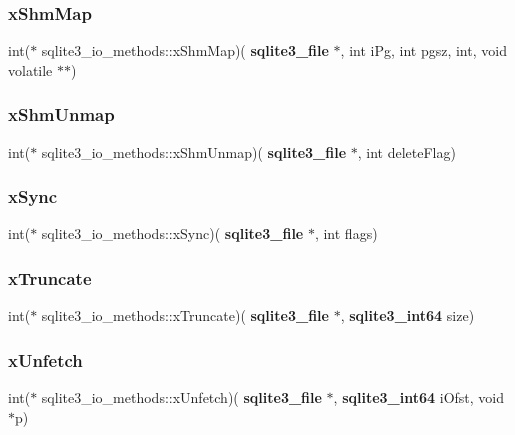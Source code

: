 \mbox{\label{structsqlite3__io__methods_a42d21006b7f01acb258986f2c090c64d}} 
\subsubsection{xShmMap}
{\footnotesize\ttfamily int($\ast$ sqlite3\+\_\+io\+\_\+methods\+::x\+Shm\+Map)(\textbf{ sqlite3\+\_\+file} $\ast$, int i\+Pg, int pgsz, int, void volatile $\ast$$\ast$)}

\mbox{\label{structsqlite3__io__methods_af69cbc7ece1854576ac262f986871563}} 
\subsubsection{xShmUnmap}
{\footnotesize\ttfamily int($\ast$ sqlite3\+\_\+io\+\_\+methods\+::x\+Shm\+Unmap)(\textbf{ sqlite3\+\_\+file} $\ast$, int delete\+Flag)}

\mbox{\label{structsqlite3__io__methods_a8d39ac02aeb1eb63622008217031b098}} 
\subsubsection{xSync}
{\footnotesize\ttfamily int($\ast$ sqlite3\+\_\+io\+\_\+methods\+::x\+Sync)(\textbf{ sqlite3\+\_\+file} $\ast$, int flags)}

\mbox{\label{structsqlite3__io__methods_a981cc60fc305bfb38eecd7123a513a20}} 
\subsubsection{xTruncate}
{\footnotesize\ttfamily int($\ast$ sqlite3\+\_\+io\+\_\+methods\+::x\+Truncate)(\textbf{ sqlite3\+\_\+file} $\ast$, \textbf{ sqlite3\+\_\+int64} size)}

\mbox{\label{structsqlite3__io__methods_a81c025bf5851547d47ceef8e83214692}} 
\subsubsection{xUnfetch}
{\footnotesize\ttfamily int($\ast$ sqlite3\+\_\+io\+\_\+methods\+::x\+Unfetch)(\textbf{ sqlite3\+\_\+file} $\ast$, \textbf{ sqlite3\+\_\+int64} i\+Ofst, void $\ast$p)}

